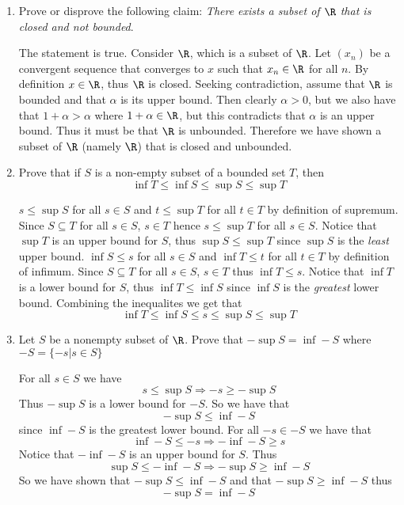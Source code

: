 \documentclass[11pt]{exam}
\begin{document}
    \begin{enumerate}
        \item Prove or disprove the following claim: \textit{There exists a subset of $\R$ that is closed and not bounded}.
            \begin{solution}
                The statement is true. Consider $\R$, which is a subset of $\R$. Let $(x_n)$ be a convergent sequence that converges to $x$ such that $x_n \in \R$ for all $n$. By definition $x \in \R$, thus $\R$ is closed. Seeking contradiction, assume that $\R$ is bounded and that $\alpha$ is its upper bound. Then clearly $\alpha > 0$, but we also have that $1 + \alpha > \alpha$ where $1 + \alpha \in \R$, but this contradicts that $\alpha$ is an upper bound. Thus it must be that $\R$ is unbounded. Therefore we have shown a subset of $\R$ (namely $\R$) that is closed and unbounded.
            \end{solution}
        \item Prove that if $S$ is a non-empty subset of a bounded set $T$, then $$\inf T \leq \inf S \leq \sup S \leq \sup T$$
            \begin{solution}
                $s \leq \sup S$ for all $s \in S$ and $t \leq \sup T$ for all $t \in T$ by definition of supremum. Since $S \subseteq T$ for all $s \in S$, $s \in T$ hence $s \leq \sup T$ for all $s \in S$. Notice that $\sup T$ is an upper bound for $S$, thus $\sup S \leq \sup T$ since $\sup S$ is the \textit{least} upper bound. $\inf S \leq s$ for all $s \in S$ and $\inf T \leq t$ for all $t \in T$ by definition of infimum. Since $S \subseteq T$ for all $s \in S$, $s \in T$ thus $\inf T \leq s$. Notice that $\inf T$ is a lower bound for $S$, thus $\inf T \leq \inf S$ since $\inf S$ is the \textit{greatest} lower bound. Combining the inequalites we get that 
                $$\inf T \leq \inf S \leq s \leq \sup S \leq \sup T$$
            \end{solution}
        \item Let $S$ be a nonempty subset of $\R$. Prove that $-\sup S = \inf -S$ where $-S = \{-s | s \in S\}$
            \begin{solution}
                For all $s \in S$ we have $$s \leq \sup S \Longrightarrow -s \geq -\sup S$$ Thus $-\sup S$ is a lower bound for $-S$. So we have that $$-\sup S \leq  \inf -S$$ since $\inf - S$ is the greatest lower bound. 
                For all $-s \in -S$ we have that $$\inf -S \leq -s \Longrightarrow -\inf -S \geq s$$ Notice that $-\inf -S$ is an upper bound for $S$. Thus $$\sup S \leq -\inf -S \Longrightarrow -\sup S \geq \inf -S$$ So we have shown that $-\sup S \leq  \inf -S$ and that $-\sup S \geq \inf -S$ thus $$-\sup S = \inf -S$$

\end{solution}
\end{enumerate}
\end{document}
